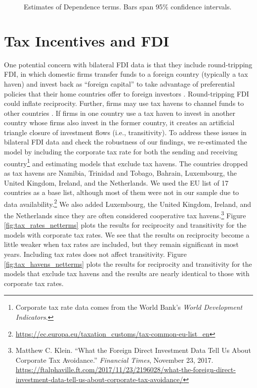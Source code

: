 \documentclass[reqno,onecolumn,letterpaper,12pt]{article}
\begin{document}
{\begin{figure}[!h]
\begin{tabular}{@{\hskip -.05cm}c@{\hskip .2cm}c@{\hskip .2cm}c}
\end{tabular}
\caption{\label{fig:q25netterms} Estimates of Dependence terms. Bars span 95\% confidence intervals. }
\end{figure}








\section{Tax Incentives and FDI}\label{taxresults}

One potential concern with bilateral FDI data is that they include round-tripping FDI, in which domestic firms transfer funds to a foreign country (typically a tax haven) and invest back as ``foreign capital'' to take advantage of preferential policies that their home countries offer to foreign investors \citep{Borga:2016}. Round-tripping FDI could inflate reciprocity. Further, firms may use tax havens to channel funds to other countries \citep{Borga:2017}. If firms in one country use a tax haven to invest in another country whose firms also invest in the former country, it creates an artificial triangle closure of investment flows (i.e., transitivity). To address these issues in bilateral FDI data and check the robustness of our findings, we re-estimated the model by including the corporate tax rate for both the sending and receiving country\footnote{Corporate tax rate data comes from the World Bank's \emph{World Development Indicators}.} and estimating models that exclude tax havens. The countries dropped as tax havens are Namibia, Trinidad and Tobago, Bahrain, Luxembourg, the United Kingdom, Ireland, and the Netherlands. We used the EU list of 17 countries as a base list, although most of them were not in our sample due to data availability.\footnote{\url{https://ec.europa.eu/taxation_customs/tax-common-eu-list_en}}  We also added Luxembourg, the United Kingdom, Ireland, and the Netherlands since they are often considered cooperative tax havens.\footnote{Matthew C. Klein. ``What the Foreign Direct Investment Data Tell Us About Corporate Tax Avoidance.'' \emph{Financial Times}, November 23, 2017. \url{https://ftalphaville.ft.com/2017/11/23/2196028/what-the-foreign-direct-investment-data-tell-us-about-corporate-tax-avoidance/}} Figure \ref{fig:tax_rates_netterms} plots the results for reciprocity and transitivity for the models with corporate tax rates. We see that the results on reciprocity become a little weaker when tax rates are included, but they remain significant in most years. Including tax rates does not affect transitivity.
Figure \ref{fig:tax_havens_netterms} plots the results for reciprocity and transitivity for the models that exclude tax havens and the results are nearly identical to those with corporate tax rates.

}
\end{document}
